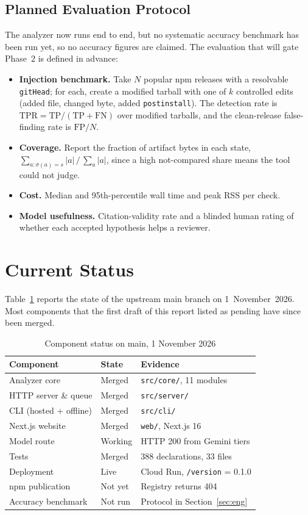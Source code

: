 \documentclass[conference]{IEEEtran}
\newcommand{\code}[1]{\texttt{#1}}
\begin{document}
\subsection{Planned Evaluation Protocol}
The analyzer now runs end to end, but no systematic accuracy benchmark has been
run yet, so no accuracy figures are claimed. The evaluation that will gate
Phase~2 is defined in advance:
\begin{itemize}
\item \textbf{Injection benchmark.} Take $N$ popular npm releases with a
resolvable \code{gitHead}; for each, create a modified tarball with one of
$k$ controlled edits (added file, changed byte, added \code{postinstall}). The
detection rate is $\mathrm{TPR}=\mathrm{TP}/(\mathrm{TP}+\mathrm{FN})$ over
modified tarballs, and the clean-release false-finding rate is
$\mathrm{FP}/N$.
\item \textbf{Coverage.} Report the fraction of artifact bytes in each state,
$\sum_{a:\sigma(a)=s}|a| \,/\, \sum_{a}|a|$, since a high
\textsf{not-compared} share means the tool could not judge.
\item \textbf{Cost.} Median and 95th-percentile wall time and peak RSS per check.
\item \textbf{Model usefulness.} Citation-validity rate and a blinded human
rating of whether each accepted hypothesis helps a reviewer.
\end{itemize}

\section{Current Status}\label{sec:status}

Table~\ref{tab:status} reports the state of the upstream main branch on
1~November~2026. Most components that the first draft of this report listed as
pending have since been merged.

\begin{table}[t]
\caption{Component status on main, 1 November 2026}
\label{tab:status}
\centering
\footnotesize
\begin{tabular}{@{}p{2.3cm}p{1.6cm}p{3.7cm}@{}}
\toprule
\textbf{Component} & \textbf{State} & \textbf{Evidence}\\
\midrule
Analyzer core & Merged & \code{src/core/}, 11 modules\\
HTTP server \& queue & Merged & \code{src/server/}\\
CLI (hosted + offline) & Merged & \code{src/cli/}\\
Next.js website & Merged & \code{web/}, Next.js 16\\
Model route & Working & HTTP 200 from Gemini tiers\\
Tests & Merged & 388 declarations, 33 files\\
Deployment & Live & Cloud Run, \code{/version} = 0.1.0\\
npm publication & Not yet & Registry returns 404\\
Accuracy benchmark & Not run & Protocol in Section~\ref{sec:eng}\\
\bottomrule
\end{tabular}
\end{table}
\end{document}
